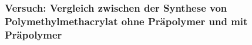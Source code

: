 \subsubsection{Versuch: Vergleich zwischen der Synthese von Polymethylmethacrylat ohne Präpolymer und mit Präpolymer}
\label{subsubsec:versuchpmma}
